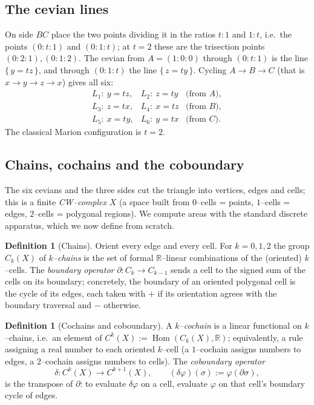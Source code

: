 \documentclass[11pt,a4paper,reqno]{amsart}
\theoremstyle{definition}
\newtheorem{definition}[theorem]{Definition}
\theoremstyle{remark}
\newcommand{\RR}{\mathbb{R}}
\begin{document}
\subsection{The cevian lines}
On side $BC$ place the two points dividing it in the ratios $t:1$ and $1:t$, i.e.\ the points
$(0:t:1)$ and $(0:1:t)$; at $t=2$ these are the trisection points $(0:2:1),(0:1:2)$. The cevian from $A=(1:0:0)$
through $(0:t:1)$ is the line $\{\,y=tz\,\}$, and through $(0:1:t)$ the line $\{\,z=ty\,\}$. Cycling
$A\to B\to C$ (that is $x\to y\to z\to x$) gives all six:
\[
\begin{array}{lll}
L_1:\ y=tz, & L_2:\ z=ty & \text{(from $A$)},\\
L_3:\ z=tx, & L_4:\ x=tz & \text{(from $B$)},\\
L_5:\ x=ty, & L_6:\ y=tx & \text{(from $C$)}.
\end{array}
\]
The classical Marion configuration is $t=2$.

\subsection{Chains, cochains and the coboundary}
The six cevians and the three sides cut the triangle into vertices, edges and cells; this is a finite
\emph{CW--complex} $X$ (a space built from $0$--cells = points, $1$--cells = edges, $2$--cells = polygonal
regions). We compute areas with the standard discrete apparatus, which we now define from scratch.

\begin{definition}[Chains]
Orient every edge and every cell. For $k=0,1,2$ the group $C_k(X)$ of \emph{$k$--chains} is the set of formal
$\RR$--linear combinations of the (oriented) $k$--cells. The \emph{boundary operator}
$\partial\colon C_k\to C_{k-1}$ sends a cell to the signed sum of the cells on its boundary; concretely, the
boundary of an oriented polygonal cell is the cycle of its edges, each taken with $+$ if its orientation agrees
with the boundary traversal and $-$ otherwise.
\end{definition}

\begin{definition}[Cochains and coboundary]
A \emph{$k$--cochain} is a linear functional on $k$--chains, i.e.\ an element of $C^k(X):=\operatorname{Hom}(C_k(X),\RR)$;
equivalently, a rule assigning a real number to each oriented $k$--cell (a $1$--cochain assigns numbers to edges, a
$2$--cochain assigns numbers to cells). The \emph{coboundary operator}
\[
\delta\colon C^{k}(X)\longrightarrow C^{k+1}(X),\qquad (\delta\varphi)(\sigma):=\varphi(\partial\sigma),
\]
is the transpose of $\partial$: to evaluate $\delta\varphi$ on a cell, evaluate $\varphi$ on that cell's boundary
cycle of edges.
\end{definition}
\end{document}
